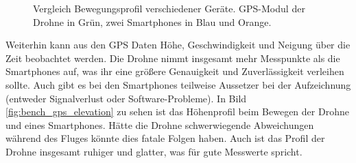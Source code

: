 \begin{figure}[h!]
    \centering
            
    \caption{Vergleich Bewegungsprofil verschiedener Geräte. GPS-Modul der Drohne in Grün, zwei Smartphones in Blau und Orange.}
    \label{fig:bench_gps}
\end{figure}

Weiterhin kann aus den GPS Daten Höhe, Geschwindigkeit und Neigung über die Zeit beobachtet werden. Die Drohne nimmt insgesamt mehr Messpunkte als die Smartphones auf, was ihr eine größere Genauigkeit und Zuverlässigkeit verleihen sollte. Auch gibt es bei den Smartphones teilweise Aussetzer bei der Aufzeichnung (entweder Signalverlust oder Software-Probleme). In Bild \ref{fig:bench_gps_elevation} zu sehen ist das Höhenprofil beim Bewegen der Drohne und eines Smartphones. Hätte die Drohne schwerwiegende Abweichungen während des Fluges könnte dies fatale Folgen haben. Auch ist das Profil der Drohne insgesamt ruhiger und glatter, was für gute Messwerte spricht.  


